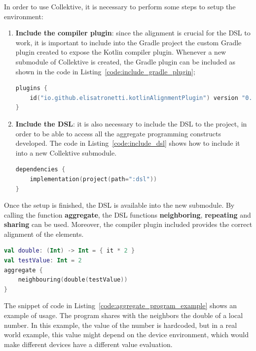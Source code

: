 In order to use Collektive, it is necessary to perform some steps to setup the environment:
\begin{enumerate}
    \item \textbf{Include the compiler plugin}: since the alignment is crucial for the DSL to work, it is important to include into the Gradle project the custom Gradle plugin created to expose the Kotlin compiler plugin.\newline
    Whenever a new submodule of Collektive is created, the Gradle plugin can be included as shown in the code in Listing~\ref{code:include_gradle_plugin};
\begin{lstlisting}[caption={Inclusion of the custom Gradle plugin to a local Gradle submodule}, captionpos=b, language=Kotlin, label={code:include_gradle_plugin}]
plugins {
    id("io.github.elisatronetti.kotlinAlignmentPlugin") version "0.1.0"
}
\end{lstlisting}
    \item \textbf{Include the DSL}: it is also necessary to include the DSL to the project, in order to be able to access all the aggregate programming constructs developed. The code in Listing~\ref{code:include_dsl} shows how to include it into a new Collektive submodule.
\begin{lstlisting}[caption={Inclusion of the DSL to a local Gradle submodule}, captionpos=b, language=Kotlin, label={code:include_dsl}]
dependencies {
    implementation(project(path=":dsl"))
}
\end{lstlisting}
\end{enumerate}

Once the setup is finished, the DSL is available into the new submodule. By calling the function \textbf{aggregate}, the DSL functions \textbf{neighboring}, \textbf{repeating} and \textbf{sharing} can be used. Moreover, the compiler plugin included provides the correct alignment of the elements.
\begin{lstlisting}[caption={Example of an aggregate program developed with Collektive}, captionpos=b, language=Kotlin, label={code:aggregate_program_example}]
val double: (Int) -> Int = { it * 2 }
val testValue: Int = 2
aggregate {
    neighbouring(double(testValue))
}
\end{lstlisting}
The snippet of code in Listing~\ref{code:aggregate_program_example} shows an example of usage. The program shares with the neighbors the double of a local number. In this example, the value of the number is hardcoded, but in a real world example, this value might depend on the device environment, which would make different devices have a different value evaluation.

